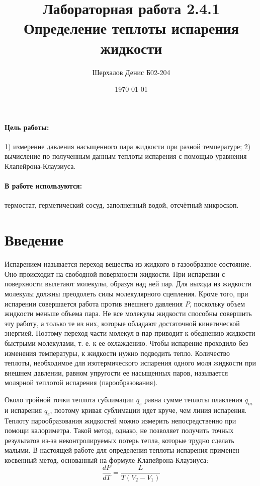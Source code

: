\documentclass[a4paper,12pt]{article}
\author{Шерхалов Денис Б02-204}
\title{Лабораторная работа 2.4.1 \\
	\textbf{Определение теплоты испарения жидкости}}
\date{\today}
\begin{document}
	
	{\Large \maketitle}

	\paragraph*{Цель работы:} 1) измерение давления насыщенного пара жидкости при разной температуре; 2) вычисление по полученным данным теплоты испарения с помощью уравнения Клапейрона-Клаузиуса.
	
	\paragraph*{В работе используются:} термостат, герметический сосуд, заполненный водой, отсчётный микроскоп.
	
	\section{Введение}
	Испарением называется переход вещества из жидкого в газообразное состояние. Оно происходит на свободной поверхности жидкости. При испарении с поверхности вылетают молекулы, образуя над ней пар. Для выхода из жидкости молекулы должны преодолеть силы молекулярного сцепления. Кроме того, при испарении совершается работа против внешнего давления $P$, поскольку объем жидкости меньше объема пара. Не все молекулы жидкости способны совершить эту работу, а только те из них, которые обладают достаточной кинетической энергией. Поэтому переход части молекул в пар приводит к обеднению жидкости быстрыми молекулами, т. е. к ее охлаждению. Чтобы испарение проходило без изменения температуры, к жидкости нужно подводить тепло. Количество теплоты, необходимое для изотермического испарения одного моля жидкости при внешнем давлении, равном упругости ее насыщенных паров, называется молярной теплотой испарения (парообразования).
	
	Около тройной точки теплота сублимации $q_s$ равна сумме теплоты плавления $q_m$ и испарения $q_e$, поэтому кривая сублимации идет круче, чем линия испарения. Теплоту парообразования жидкостей можно измерить непосредственно при помощи калориметра. Такой метод, однако, не позволяет получить точных результатов из-за неконтролируемых потерь тепла, которые трудно сделать малыми. В настоящей работе для определения теплоты испарения применен косвенный метод, основанный на формуле Клапейрона-Клаузиуса:
	\begin{equation}
		\label{Klap}
		\frac{dP}{dT} = \frac{L}{T(V_2 - V_1)}
	\end{equation}
	
\end{document}
